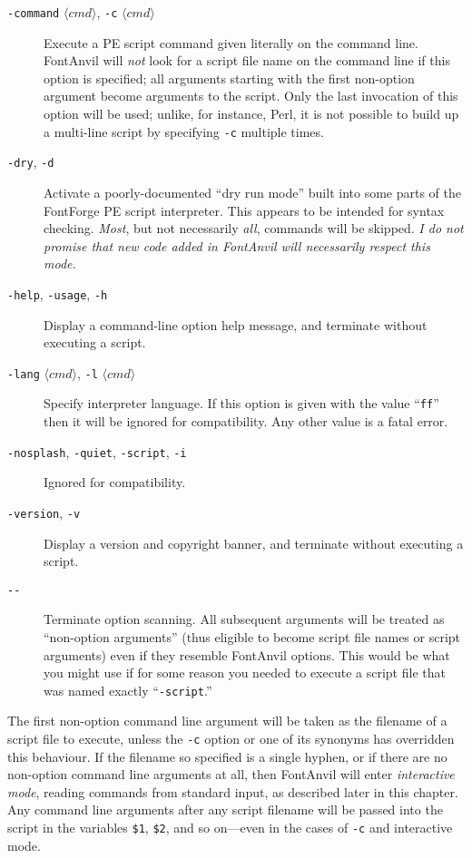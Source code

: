 \begin{description}
  \item[\texttt{-command} $\langle cmd\rangle$,
    \texttt{-c} $\langle cmd\rangle$]
  Execute a PE script command given literally on the command line.  FontAnvil
  will \emph{not} look for a script file name on the command line if this
  option is specified; all arguments starting with the first non-option
  argument become arguments to the script.  Only the last invocation of this
  option will be used; unlike, for instance, Perl, it is not possible to
  build up a multi-line script by specifying \texttt{-c} multiple times.

  \item[\texttt{-dry}, \texttt{-d}]
  Activate a poorly-documented ``dry run mode'' built into some parts of
  the FontForge PE script interpreter.  This appears to
  be intended for syntax checking.  \emph{Most}, but not necessarily
  \emph{all}, commands will be skipped.  \emph{I do not promise that new
  code added in FontAnvil will necessarily respect this mode.}

  \item[\texttt{-help}, \texttt{-usage}, \texttt{-h}]
  Display a command-line option help message, and terminate without
  executing a script.

  \item[\texttt{-lang} $\langle cmd\rangle$,
    \texttt{-l} $\langle cmd\rangle$]
  Specify interpreter language.  If this option is given with the value
  ``\texttt{ff}'' then it will be ignored for compatibility.  Any other
  value is a fatal error.

  \item[\texttt{-nosplash}, \texttt{-quiet}, \texttt{-script}, \texttt{-i}]
  Ignored for compatibility.

  \item[\texttt{-version}, \texttt{-v}]
  Display a version and copyright banner, and terminate without executing a
  script.

  \item[\texttt{-{}-}]
  Terminate option scanning.  All subsequent arguments will be treated as
  ``non-option arguments'' (thus eligible to become script file names or
  script arguments) even if they resemble FontAnvil options.  This would be
  what you might use if for some reason you needed to execute a script file
  that was named exactly ``\texttt{-script}.''
\end{description}

The first non-option command line argument will be taken as the filename of
a script file to execute, unless the \texttt{-c} option or one of its
synonyms has overridden this behaviour.  If the filename so specified is a
single hyphen, or if there are no non-option command line arguments
at all, then FontAnvil will enter \emph{interactive mode}, reading
commands from standard input, as described later in this chapter.  Any
command line arguments after any script filename will be passed
into the script in the variables \texttt{\$1},
\texttt{\$2}, and so on---even in the cases of \texttt{-c} and interactive
mode.

